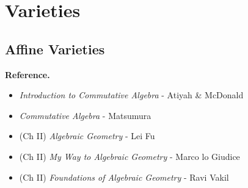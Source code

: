 \documentclass[11pt,a4paper,footinclude=true,headinclude=true]{scrbook} %
\newcommand{\<}{\langle}
\newcommand{\>}{\rangle}
\newenvironment{summary}[2][]
    { \begin{mdframed}[backgroundcolor=green!20] \textbf{#1 #2.} }
    {  \end{mdframed}}
\begin{document}
	
	\tableofcontents 


\cleardoublepage\part{Varieties}

\chapter{Affine Varieties}

\begin{summary}{Reference}
    \begin{itemize}
        \item \textit{Introduction to Commutative Algebra} - Atiyah \& McDonald
        \item \textit{Commutative Algebra} - Matsumura
        \item (Ch II) \textit{Algebraic Geometry} - Lei Fu 
        \item (Ch II) \textit{My Way to Algebraic Geometry} - Marco lo Giudice
        \item (Ch II) \textit{Foundations of Algebraic Geometry} - Ravi Vakil
    \end{itemize}
\end{summary}
\end{document}
